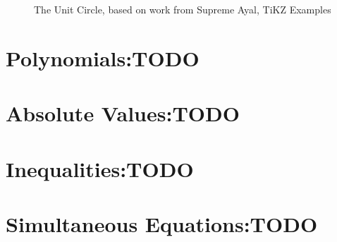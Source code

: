 \begin{figure}[!hbt]
\caption{The Unit Circle, based on work from Supreme Ayal, TiKZ Examples
\cite{HTrCS}}
\end{figure}
\newpage

\section{Polynomials:TODO}
\label{sec:Polynomials}
\lipsum[1]
\section{Absolute Values:TODO}
\label{sec:AbsoluteValues}
\lipsum[1]
\section{Inequalities:TODO}
\label{sec:Inequalities}
\lipsum[1]
\section{Simultaneous Equations:TODO}
\label{sec:SimultaneousEquations}
\lipsum[1]
